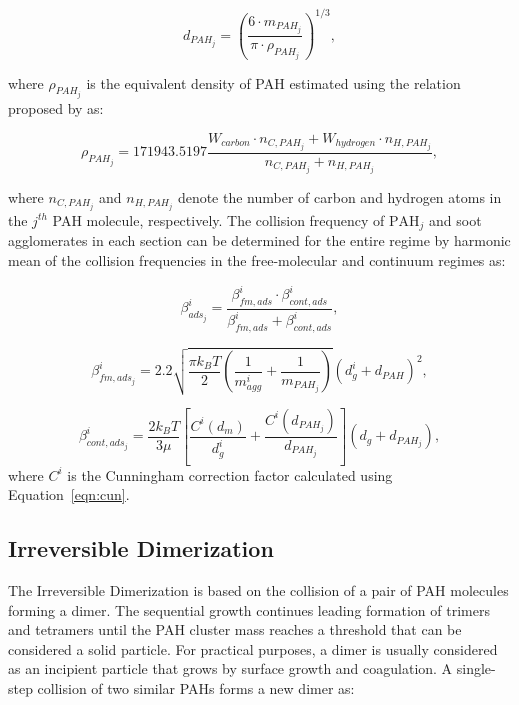 \begin{equation}
	d_{PAH_j}=
	\left(
	\frac{6\cdot m_{{PAH}_j}}{\pi\cdot\rho_{{PAH}_j}}
	\right)^{1/3},
	\label{eqn:dPAH}
\end{equation}

\noindent where $\rho_{PAH_j}$ is the equivalent density of PAH estimated using the relation proposed by \citet{johansson2016formation} as:

\begin{equation}
	\rho_{PAH_j}= 
	171943.5197
	\frac{W_{carbon}\cdot n_{C,{PAH}_j}+W_{hydrogen}\cdot n_{H,{PAH}_j}}
	{n_{C,{PAH}_j}+n_{H,{PAH}_j}},
	\label{eqn:rhoPAH}
\end{equation}

\noindent where ${n_{C,{PAH}_j}}$ and ${n_{H,{PAH}_j}}$ denote the number of carbon and hydrogen atoms in the $j^{th}$ PAH molecule, respectively. The collision frequency of $\mathrm{PAH}_j$ and soot agglomerates in each section can be determined for the entire regime by harmonic mean of the collision frequencies in the free-molecular and continuum regimes as:

\begin{equation}
	\beta^i_{ads_j}=
	\frac{\beta^i_{fm, ads}\cdot \beta^i_{cont, ads}}
	{\beta^i_{fm, ads}+\beta^i_{cont, ads}},
	\label{eqn:betahmads}
\end{equation}

\begin{equation}
	\beta^i_{fm, ads_j}=
	2.2 
	\sqrt{
		\frac{\pi k_B T}{2}\left(\frac{1}{m^i_{agg}}+\frac{1}{m_{PAH_j}}\right)
	}
	\left(d^i_g+d_{PAH}\right)^2,
	\label{eqn:betafmads}
\end{equation}

\begin{equation}
	\beta^i_{cont, ads_j}=
	\frac{2 k_B T}{3 \mu}
	\left[
	\frac{C^i\left(d_m\right)}{d^i_g}+
	\frac{C^i\left(d_{PAH_j}\right)}{d_{PAH_j}}
	\right]
	\left(d_g+d_{PAH_j}\right),
	\label{eqn:betacontads}
\end{equation}
where $C^i$ is the Cunningham correction factor calculated using Equation~\eqref{eqn:cun}.
\subsection{Irreversible Dimerization}
\label{sec:irrevdim}

The Irreversible Dimerization is based on the collision of a pair of PAH molecules forming a dimer. The sequential growth continues leading formation of trimers and tetramers until the PAH cluster mass reaches a threshold that can be considered a solid particle. For practical purposes, a dimer is usually considered as an incipient particle that grows by surface growth and coagulation. A single-step collision of two similar PAHs forms a new dimer as:

